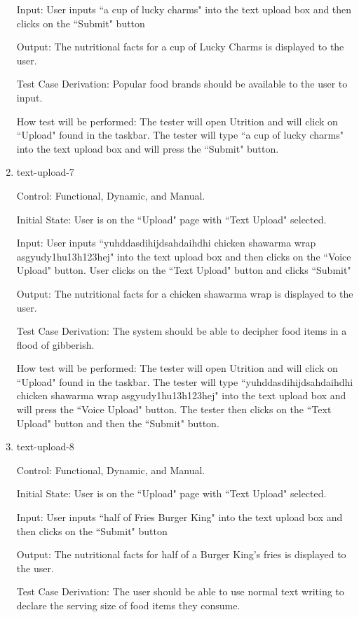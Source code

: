 \documentclass[12pt, titlepage]{article}
\begin{document}
\begin{enumerate}
	Input: User inputs ``a cup of lucky charms" into the text upload box and then clicks on the ``Submit" button
	
	Output: The nutritional facts for a cup of Lucky Charms is displayed to the user.
	
	Test Case Derivation: Popular food brands should be available to the user to input.
	
	How test will be performed: The tester will open Utrition and will click on ``Upload" found in the taskbar. The tester will type ``a cup of lucky charms" into the text upload box and will press the ``Submit" button.
	
	\item{text-upload-7\\}
	
	Control: Functional, Dynamic, and Manual.
	
	Initial State: User is on the ``Upload" page with ``Text Upload" selected.
	
	Input: User inputs ``yuhddasdihijdsahdaihdhi chicken shawarma wrap asgyudy1hu13h123hej" into the text upload box and then clicks on the ``Voice Upload" button. User clicks on the ``Text Upload" button and clicks ``Submit"
	
	Output: The nutritional facts for a chicken shawarma wrap is displayed to the user.
	
	Test Case Derivation: The system should be able to decipher food items in a flood of gibberish.
	
	How test will be performed: The tester will open Utrition and will click on ``Upload" found in the taskbar. The tester will type ``yuhddasdihijdsahdaihdhi chicken shawarma wrap asgyudy1hu13h123hej" into the text upload box and will press the ``Voice Upload" button. The tester then clicks on the ``Text Upload" button and then the ``Submit" button.
	
	\item{text-upload-8\\}
	
	Control: Functional, Dynamic, and Manual.
	
	Initial State: User is on the ``Upload" page with ``Text Upload" selected.
	
	Input: User inputs ``half of Fries Burger King" into the text upload box and then clicks on the ``Submit" button
	
	Output: The nutritional facts for half of a Burger King's fries is displayed to the user.
	
	Test Case Derivation: The user should be able to use normal text writing to declare the serving size of food items they consume.
	

\end{enumerate}
\end{document}
